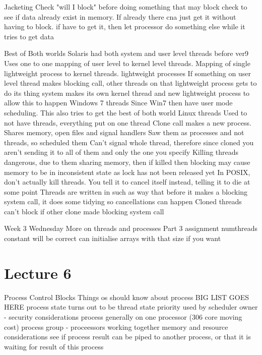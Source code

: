 \documentclass{article}
\begin{document}
	Jacketing
		Check "will I block" before doing something that may block
			check to see if data already exist in memory. If already there cna just get it without having to block. if have to get it, then let processor do something else while it tries to get data

	Best of Both worlds
		Solaris had both system and user level threads before ver9
			Uses one to one mapping of user level to kernel level threads.
			Mapping of single lightweight process to kernel threads. 
				lightweight processes
			If something on user level thread makes blocking call, other threads on that lightweight process gets to do its thing
				system makes its own kernel thread and new lightweight process to allow this to happen
		Windows 7 threads
			Since Win7 then have user mode scheduling. This also tries to get the best of both world
		Linux threads
			Used to not have threads, everything put on one thread
			Clone call
				makes a new process. Shares memory, open files and signal handlers
			Saw them as processes and not threads, so scheduled them
			Can't signal whole thread, therefore since cloned you aren't sending it to all of them and only the one you specify
			Killing threads dangerous, due to them sharing memory, then if killed then blocking may cause memory to be in inconsistent state as lock has not been released yet
			In POSIX, don't actually kill threads. You tell it to cancel itself instead, telling it to die at some point
				Threads are written in such as way that before it makes a blocking system call, it does some tidying so cancellations can happen
			Cloned threads can't block if other clone made blocking system call






Week 3 Wednesday
	More on threads and processes
	Part 3 assignment
		numthreads constant will be correct
			can initialise arrays with that size if you want

\section{Lecture 6}
	Process Control Blocks
		Things os should know about process
			BIG LIST GOES HERE
				process state turns out to be thread state
				priority used by scheduler
				owner - security considerations
				process generally on one processor (306 core moving cost)
				process group - proceessors working together
				memory and resource considerations
				see if process result can be piped to another process, or that it is waiting for result of this process
\end{document}
